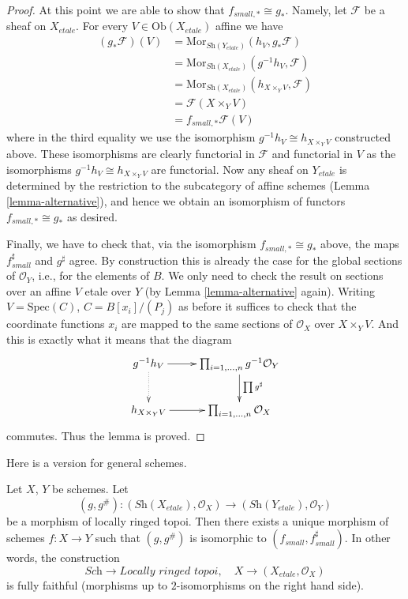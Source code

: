 \begin{proof}
\medskip\noindent
At this point we are able to show that $f_{small, *} \cong g_*$.
Namely, let $\mathcal{F}$ be a sheaf on $X_{etale}$. For every
$V \in \text{Ob}(X_{etale})$ affine we have
\begin{align*}
(g_*\mathcal{F})(V)
& =
\text{Mor}_{\textit{Sh}(Y_{etale})}(h_V, g_*\mathcal{F}) \\
& =
\text{Mor}_{\textit{Sh}(X_{etale})}(g^{-1}h_V, \mathcal{F}) \\
& =
\text{Mor}_{\textit{Sh}(X_{etale})}(h_{X \times_Y V}, \mathcal{F}) \\
& =
\mathcal{F}(X \times_Y V) \\
& =
f_{small, *}\mathcal{F}(V)
\end{align*}
where in the third equality we use the isomorphism
$g^{-1}h_V \cong h_{X \times_Y V}$ constructed above. These isomorphisms
are clearly functorial in $\mathcal{F}$ and functorial in $V$ 
as the isomorphisms $g^{-1}h_V \cong h_{X \times_Y V}$ are functorial.
Now any sheaf on $Y_{etale}$ is determined by the restriction 
to the subcategory of affine schemes
(Lemma \ref{lemma-alternative}),
and hence we obtain an isomorphism of functors $f_{small, *} \cong g_*$
as desired.

\medskip\noindent
Finally, we have to check that, via the isomorphism
$f_{small, *} \cong g_*$ above, the maps $f_{small}^\sharp$ and
$g^\sharp$ agree. By construction this is already the case for the
global sections of $\mathcal{O}_Y$, i.e., for the elements of $B$.
We only need to check the result on
sections over an affine $V$ etale over $Y$ (by
Lemma \ref{lemma-alternative}
again). Writing
$V = \text{Spec}(C)$, $C = B[x_i]/(P_j)$ as before it suffices
to check that the coordinate functions $x_i$ are mapped to
the same sections of $\mathcal{O}_X$ over $X \times_Y V$.
And this is exactly what it means that the diagram
$$
\xymatrix{
g^{-1}h_V \ar[r] \ar@{..>}[d] &
\prod\nolimits_{i = 1, \ldots, n} g^{-1}\mathcal{O}_Y 
\ar[d]^{\prod g^\sharp} \\
h_{X \times_Y V} \ar[r] &
\prod\nolimits_{i = 1, \ldots, n} \mathcal{O}_X
}
$$
commutes. Thus the lemma is proved.
\end{proof}

\noindent
Here is a version for general schemes.

\begin{theorem}
\label{theorem-fully-faithful}
Let $X$, $Y$ be schemes. Let
$$
(g, g^\#) :
(\textit{Sh}(X_{etale}), \mathcal{O}_X)
\longrightarrow
(\textit{Sh}(Y_{etale}), \mathcal{O}_Y)
$$
be a morphism of locally ringed topoi. Then there exists a
unique morphism of schemes $f : X \to Y$ such that
$(g, g^\#)$ is isomorphic to $(f_{small}, f_{small}^\sharp)$.
In other words, the construction
$$
\textit{Sch} \longrightarrow \textit{Locally ringed topoi},
\quad
X \longrightarrow (X_{etale}, \mathcal{O}_X)
$$
is fully faithful (morphisms up to $2$-isomorphisms on the right hand side).
\end{theorem}


